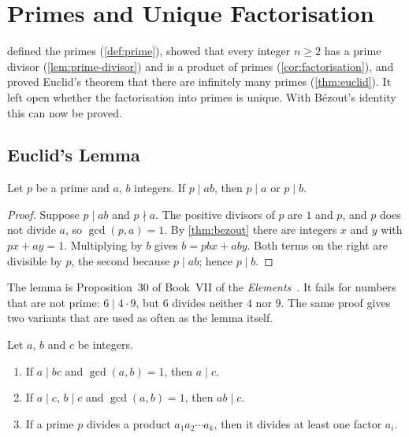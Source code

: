 \section{Primes and Unique Factorisation}
\label{sec:primes}

 defined the primes (\cref{def:prime}), showed that every integer $n\ge2$ has a prime divisor (\cref{lem:prime-divisor}) and is a product of primes (\cref{cor:factorisation}), and proved Euclid's theorem that there are infinitely many primes (\cref{thm:euclid}). It left open whether the factorisation into primes is unique. With B\'ezout's identity this can now be proved.

\subsection{Euclid's Lemma}

\begin{lemma}
\label{lem:euclid}
Let $p$ be a prime and $a$, $b$ integers. If $p\mid ab$, then $p\mid a$ or $p\mid b$.
\end{lemma}

\begin{proof}
Suppose $p\mid ab$ and $p\nmid a$. The positive divisors of $p$ are $1$ and $p$, and $p$ does not divide $a$, so $\gcd(p,a)=1$. By \cref{thm:bezout} there are integers $x$ and $y$ with $px+ay=1$. Multiplying by $b$ gives $b=pbx+aby$. Both terms on the right are divisible by $p$, the second because $p\mid ab$; hence $p\mid b$.
\end{proof}

The lemma is Proposition~30 of Book~VII of the \emph{Elements}~\cite{heath1956euclid}. It fails for numbers that are not prime: $6\mid4\cdot9$, but $6$ divides neither $4$ nor $9$. The same proof gives two variants that are used as often as the lemma itself.

\begin{corollary}
\label{cor:euclid-lemma}
Let $a$, $b$ and $c$ be integers.
\begin{enumerate}
\item If $a\mid bc$ and $\gcd(a,b)=1$, then $a\mid c$.
\item If $a\mid c$, $b\mid c$ and $\gcd(a,b)=1$, then $ab\mid c$.
\item If a prime $p$ divides a product $a_1a_2\cdots a_k$, then it divides at least one factor $a_i$.
\end{enumerate}
\end{corollary}

